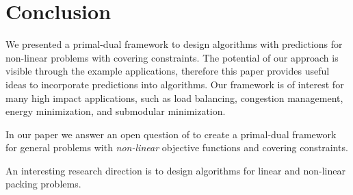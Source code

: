 
\section{Conclusion}

We presented a primal-dual framework to design algorithms with predictions for non-linear problems with covering constraints.
The potential of our approach is visible through the example applications, therefore this paper provides useful ideas to incorporate predictions into algorithms.
Our framework is of interest for many high impact applications, such as load balancing, congestion management, energy minimization, and submodular minimization.

In our paper we answer an open question of \cite{BamasMaggiori20:The-Primal-Dual-method} to create a primal-dual framework for general problems with \emph{non-linear} objective functions and covering constraints.

An interesting research direction is to design algorithms for linear and non-linear packing problems.
